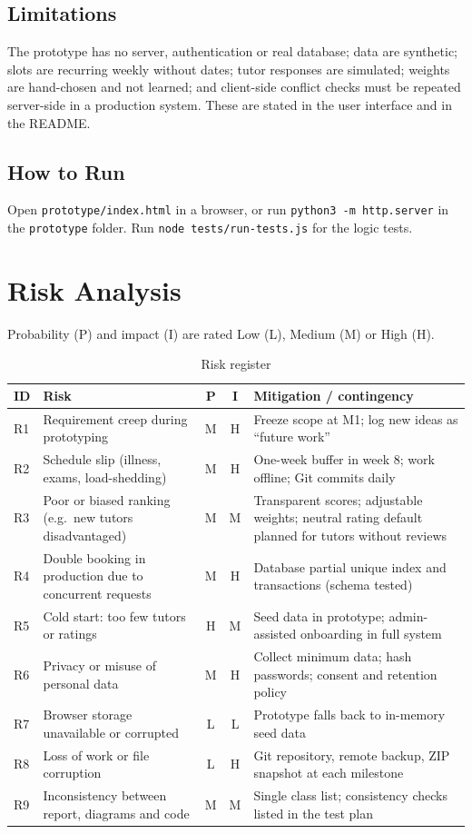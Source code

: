 \documentclass[11pt,a4paper]{article}
\begin{document}
\subsection{Limitations}
The prototype has no server, authentication or real database; data are synthetic; slots are recurring weekly without dates; tutor responses are simulated; weights are hand-chosen and not learned; and client-side conflict checks must be repeated server-side in a production system. These are stated in the user interface and in the README.

\subsection{How to Run}
Open \texttt{prototype/index.html} in a browser, or run \texttt{python3 -m http.server} in the \texttt{prototype} folder. Run \texttt{node tests/run-tests.js} for the logic tests.

\section{Risk Analysis}
Probability (P) and impact (I) are rated Low (L), Medium (M) or High (H).
\begin{table}[H]
\centering
\caption{Risk register}
\small
\begin{tabularx}{\linewidth}{@{}l X c c X@{}}
\toprule
\textbf{ID} & \textbf{Risk} & \textbf{P} & \textbf{I} & \textbf{Mitigation / contingency}\\ \midrule
R1 & Requirement creep during prototyping & M & H & Freeze scope at M1; log new ideas as ``future work''\\
R2 & Schedule slip (illness, exams, load-shedding) & M & H & One-week buffer in week 8; work offline; Git commits daily\\
R3 & Poor or biased ranking (e.g.\ new tutors disadvantaged) & M & M & Transparent scores; adjustable weights; neutral rating default planned for tutors without reviews\\
R4 & Double booking in production due to concurrent requests & M & H & Database partial unique index and transactions (schema tested)\\
R5 & Cold start: too few tutors or ratings & H & M & Seed data in prototype; admin-assisted onboarding in full system\\
R6 & Privacy or misuse of personal data & M & H & Collect minimum data; hash passwords; consent and retention policy\\
R7 & Browser storage unavailable or corrupted & L & L & Prototype falls back to in-memory seed data\\
R8 & Loss of work or file corruption & L & H & Git repository, remote backup, ZIP snapshot at each milestone\\
R9 & Inconsistency between report, diagrams and code & M & M & Single class list; consistency checks listed in the test plan\\
\bottomrule
\end{tabularx}
\end{table}
\end{document}
